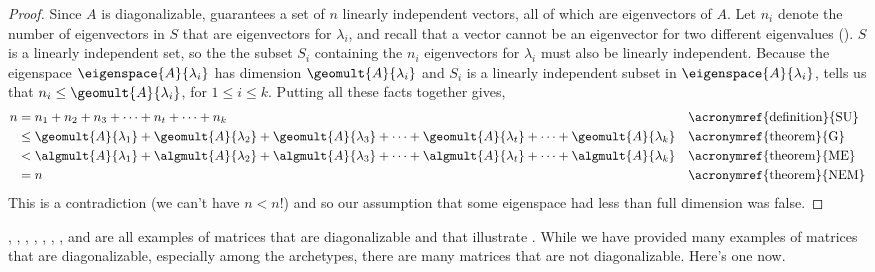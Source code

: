\begin{proof}
%
Since $A$ is diagonalizable,  guarantees a set of $n$ linearly independent vectors, all of which are eigenvectors of $A$.  Let $n_i$ denote the number of eigenvectors in $S$ that are eigenvectors for $\lambda_i$, and recall that a vector cannot be an eigenvector for two different eigenvalues ().  $S$ is a linearly independent set, so the the subset $S_i$ containing the $n_i$ eigenvectors for $\lambda_i$ must also be linearly independent.  Because the eigenspace $\eigenspace{A}{\lambda_i}$ has dimension $\geomult{A}{\lambda_i}$ and $S_i$ is a linearly independent subset in $\eigenspace{A}{\lambda_i}$,  tells us that $n_i\leq\geomult{A}{\lambda_i}$, for $1\leq i\leq k$.
Putting all these facts together gives,
%
\begin{align*}
n
&=n_1+n_2+n_3+\cdots+n_t+\cdots+n_k
&&\text{\acronymref{definition}{SU}}\\
%
&\leq\geomult{A}{\lambda_1}+\geomult{A}{\lambda_2}+\geomult{A}{\lambda_3}+\cdots+\geomult{A}{\lambda_t}+\cdots+\geomult{A}{\lambda_k}
&&\text{\acronymref{theorem}{G}}\\
%
&<\algmult{A}{\lambda_1}+\algmult{A}{\lambda_2}+\algmult{A}{\lambda_3}+\cdots+\algmult{A}{\lambda_t}+\cdots+\algmult{A}{\lambda_k}&&\text{\acronymref{theorem}{ME}}\\
%
&=n
&&\text{\acronymref{theorem}{NEM}}
%
\end{align*}
%
This is a contradiction (we can't have $n<n$!) and so our assumption that some eigenspace had less than full dimension was false.
%
\end{proof}
%
, 
, 
, 
, 
,  
, 
, 
 and 
are all examples of matrices that are diagonalizable and that illustrate .  While we have provided many examples of matrices that are diagonalizable, especially among the archetypes, there are many matrices that are not diagonalizable.  Here's one now.
%
